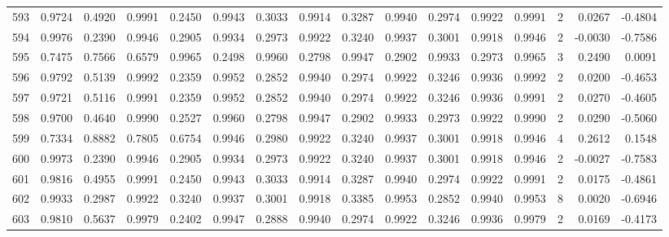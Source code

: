 \begin{tabular}{lrrrrrrrrrrrrrrr}
593 &      0.9724 &  0.4920 &  0.9991 &  0.2450 &  0.9943 &  0.3033 &  0.9914 &  0.3287 &  0.9940 &  0.2974 &   0.9922 &     0.9991 &      2 &                    0.0267 &                    -0.4804 \\
594 &      0.9976 &  0.2390 &  0.9946 &  0.2905 &  0.9934 &  0.2973 &  0.9922 &  0.3240 &  0.9937 &  0.3001 &   0.9918 &     0.9946 &      2 &                   -0.0030 &                    -0.7586 \\
595 &      0.7475 &  0.7566 &  0.6579 &  0.9965 &  0.2498 &  0.9960 &  0.2798 &  0.9947 &  0.2902 &  0.9933 &   0.2973 &     0.9965 &      3 &                    0.2490 &                     0.0091 \\
596 &      0.9792 &  0.5139 &  0.9992 &  0.2359 &  0.9952 &  0.2852 &  0.9940 &  0.2974 &  0.9922 &  0.3246 &   0.9936 &     0.9992 &      2 &                    0.0200 &                    -0.4653 \\
597 &      0.9721 &  0.5116 &  0.9991 &  0.2359 &  0.9952 &  0.2852 &  0.9940 &  0.2974 &  0.9922 &  0.3246 &   0.9936 &     0.9991 &      2 &                    0.0270 &                    -0.4605 \\
598 &      0.9700 &  0.4640 &  0.9990 &  0.2527 &  0.9960 &  0.2798 &  0.9947 &  0.2902 &  0.9933 &  0.2973 &   0.9922 &     0.9990 &      2 &                    0.0290 &                    -0.5060 \\
599 &      0.7334 &  0.8882 &  0.7805 &  0.6754 &  0.9946 &  0.2980 &  0.9922 &  0.3240 &  0.9937 &  0.3001 &   0.9918 &     0.9946 &      4 &                    0.2612 &                     0.1548 \\
600 &      0.9973 &  0.2390 &  0.9946 &  0.2905 &  0.9934 &  0.2973 &  0.9922 &  0.3240 &  0.9937 &  0.3001 &   0.9918 &     0.9946 &      2 &                   -0.0027 &                    -0.7583 \\
601 &      0.9816 &  0.4955 &  0.9991 &  0.2450 &  0.9943 &  0.3033 &  0.9914 &  0.3287 &  0.9940 &  0.2974 &   0.9922 &     0.9991 &      2 &                    0.0175 &                    -0.4861 \\
602 &      0.9933 &  0.2987 &  0.9922 &  0.3240 &  0.9937 &  0.3001 &  0.9918 &  0.3385 &  0.9953 &  0.2852 &   0.9940 &     0.9953 &      8 &                    0.0020 &                    -0.6946 \\
603 &      0.9810 &  0.5637 &  0.9979 &  0.2402 &  0.9947 &  0.2888 &  0.9940 &  0.2974 &  0.9922 &  0.3246 &   0.9936 &     0.9979 &      2 &                    0.0169 &                    -0.4173 \\

\end{tabular}
